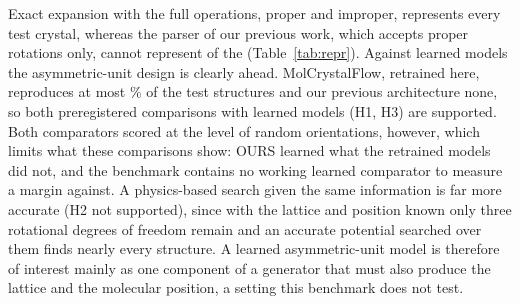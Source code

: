 \documentclass[journal=acsodf,manuscript=article]{achemso}
\begin{document}
Exact expansion with the full operations, proper and improper, represents every test
crystal, whereas the parser of our previous work, which accepts proper rotations only,
cannot represent \nRLegacy{} of the \nN{} (Table~\ref{tab:repr}). Against learned models
the asymmetric-unit design is clearly ahead. MolCrystalFlow, retrained here, reproduces at
most \nMcfRGPick\% of the test structures and our previous architecture none, so both
preregistered comparisons with learned models (H1, H3) are supported. Both comparators
scored at the level of random orientations, however, which limits what these comparisons
show: OURS learned what the retrained models did not, and the benchmark contains no working
learned comparator to measure a margin against. A physics-based search given the same
information is far more accurate (H2 not supported), since with the lattice and position
known only three rotational degrees of freedom remain and an accurate potential searched
over them finds nearly every structure. A learned asymmetric-unit model is therefore of
interest mainly as one component of a generator that must also produce the lattice and the
molecular position, a setting this benchmark does not test.

\end{document}
